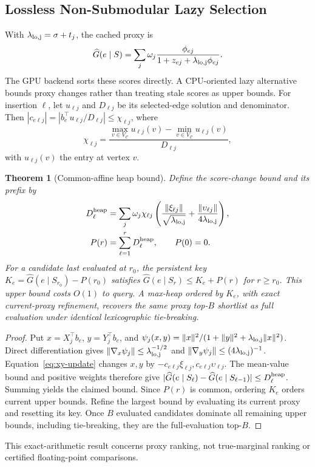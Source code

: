 \documentclass[conference]{IEEEtran}
\newtheorem{theorem}{Theorem}
\theoremstyle{definition}
\begin{document}
\subsection{Lossless Non-Submodular Lazy Selection}
\label{sec:lazy}
With $\lambda_{\rm lo,j}=\sigma+t_j$, the cached proxy is
\begin{equation}
\widehat G(e\mid S)=\sum_j\omega_j
\frac{\phi_{ej}}{1+z_{ej}+\lambda_{\rm lo,j}\phi_{ej}}.
\label{eq:proxy-cache-score}
\end{equation}
The GPU backend sorts these scores directly. A CPU-oriented lazy
alternative bounds proxy changes rather than treating stale scores
as upper bounds. For insertion $\ell$, let $u_{\ell j}$ and
$D_{\ell j}$ be its selected-edge solution and denominator. Then
$|c_{e\ell j}|=|b_e^\top u_{\ell j}/D_{\ell j}|\le\chi_{\ell j}$, where
\[
\chi_{\ell j}=\frac{\max_{v\in V_{\mathcal C}}u_{\ell j}(v)
-\min_{v\in V_{\mathcal C}}u_{\ell j}(v)}{D_{\ell j}},
\]
with $u_{\ell j}(v)$ the entry at vertex $v$.
\begin{theorem}[Common-affine heap bound]
\label{thm:lazy-envelope}
Define the score-change bound and its prefix by
\begin{equation}
\begin{aligned}
D_\ell^{\rm heap}
&=\sum_j\omega_j\chi_{\ell j}
\left(\frac{\|\xi_{\ell j}\|}{\sqrt{\lambda_{\rm lo,j}}}
+\frac{\|\upsilon_{\ell j}\|}{4\lambda_{\rm lo,j}}\right),\\
P(r)&=\sum_{\ell=1}^rD_\ell^{\rm heap},\qquad P(0)=0.
\end{aligned}
\label{eq:common-heap-prefix}
\end{equation}
For a candidate last evaluated at $r_0$, the persistent key
$K_e=\widehat G(e\mid S_{r_0})-P(r_0)$ satisfies
$\widehat G(e\mid S_r)\le K_e+P(r)$ for $r\ge r_0$.
This upper bound costs $O(1)$ to query. A max-heap ordered by
$K_e$, with exact current-proxy refinement, recovers the same
proxy top-$B$ shortlist as full evaluation under identical
lexicographic tie-breaking.
\end{theorem}
\begin{proof}
Put $x=X_j^\top b_e$, $y=Y_j^\top b_e$, and
$\psi_j(x,y)=\|x\|^2/(1+\|y\|^2+\lambda_{\rm lo,j}\|x\|^2)$.
Direct differentiation gives
$\|\nabla_x\psi_j\|\le \lambda_{\rm lo,j}^{-1/2}$ and
$\|\nabla_y\psi_j\|\le(4\lambda_{\rm lo,j})^{-1}$.
Equation~\eqref{eq:xy-update} changes $x,y$ by
$-c_{e\ell j}\xi_{\ell j},c_{e\ell j}\upsilon_{\ell j}$.
The mean-value bound and positive weights therefore give
$|\widehat G(e\mid S_\ell)-\widehat G(e\mid S_{\ell-1})|
\le D_\ell^{\rm heap}$. Summing yields the claimed bound.
Since $P(r)$ is common, ordering $K_e$ orders current upper bounds.
Refine the largest bound by evaluating its current proxy and resetting
its key. Once $B$ evaluated candidates dominate all remaining upper
bounds, including tie-breaking, they are the full-evaluation top-$B$.
\end{proof}
This exact-arithmetic result concerns proxy ranking, not true-marginal
ranking or certified floating-point comparisons.
\end{document}
